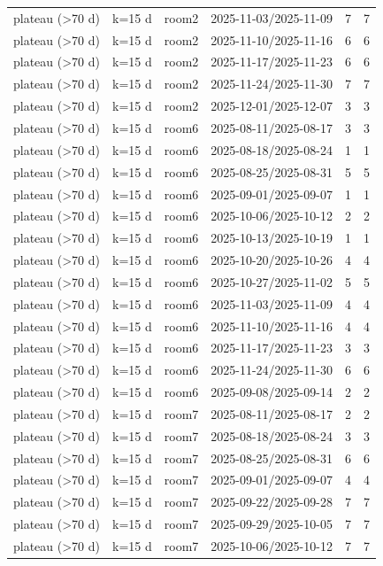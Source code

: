 \begin{tabular}{llllll}
plateau (>70 d) & k=15 d & room2 & 2025-11-03/2025-11-09 & 7 & 7 \\
plateau (>70 d) & k=15 d & room2 & 2025-11-10/2025-11-16 & 6 & 6 \\
plateau (>70 d) & k=15 d & room2 & 2025-11-17/2025-11-23 & 6 & 6 \\
plateau (>70 d) & k=15 d & room2 & 2025-11-24/2025-11-30 & 7 & 7 \\
plateau (>70 d) & k=15 d & room2 & 2025-12-01/2025-12-07 & 3 & 3 \\
plateau (>70 d) & k=15 d & room6 & 2025-08-11/2025-08-17 & 3 & 3 \\
plateau (>70 d) & k=15 d & room6 & 2025-08-18/2025-08-24 & 1 & 1 \\
plateau (>70 d) & k=15 d & room6 & 2025-08-25/2025-08-31 & 5 & 5 \\
plateau (>70 d) & k=15 d & room6 & 2025-09-01/2025-09-07 & 1 & 1 \\
plateau (>70 d) & k=15 d & room6 & 2025-10-06/2025-10-12 & 2 & 2 \\
plateau (>70 d) & k=15 d & room6 & 2025-10-13/2025-10-19 & 1 & 1 \\
plateau (>70 d) & k=15 d & room6 & 2025-10-20/2025-10-26 & 4 & 4 \\
plateau (>70 d) & k=15 d & room6 & 2025-10-27/2025-11-02 & 5 & 5 \\
plateau (>70 d) & k=15 d & room6 & 2025-11-03/2025-11-09 & 4 & 4 \\
plateau (>70 d) & k=15 d & room6 & 2025-11-10/2025-11-16 & 4 & 4 \\
plateau (>70 d) & k=15 d & room6 & 2025-11-17/2025-11-23 & 3 & 3 \\
plateau (>70 d) & k=15 d & room6 & 2025-11-24/2025-11-30 & 6 & 6 \\
plateau (>70 d) & k=15 d & room6 & 2025-09-08/2025-09-14 & 2 & 2 \\
plateau (>70 d) & k=15 d & room7 & 2025-08-11/2025-08-17 & 2 & 2 \\
plateau (>70 d) & k=15 d & room7 & 2025-08-18/2025-08-24 & 3 & 3 \\
plateau (>70 d) & k=15 d & room7 & 2025-08-25/2025-08-31 & 6 & 6 \\
plateau (>70 d) & k=15 d & room7 & 2025-09-01/2025-09-07 & 4 & 4 \\
plateau (>70 d) & k=15 d & room7 & 2025-09-22/2025-09-28 & 7 & 7 \\
plateau (>70 d) & k=15 d & room7 & 2025-09-29/2025-10-05 & 7 & 7 \\
plateau (>70 d) & k=15 d & room7 & 2025-10-06/2025-10-12 & 7 & 7 \\

\end{tabular}
